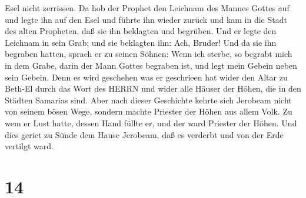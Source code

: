 Esel nicht zerrissen.  Da hob der Prophet den Leichnam des
Mannes Gottes auf und legte ihn auf den Esel und führte ihn wieder
zurück und kam in die Stadt des alten Propheten, daß sie ihn beklagten
und begrüben.  Und er legte den Leichnam in sein Grab; und
sie beklagten ihn: Ach, Bruder!  Und da sie ihn begraben
hatten, sprach er zu seinen Söhnen: Wenn ich sterbe, so begrabt mich in
dem Grabe, darin der Mann Gottes begraben ist, und legt mein Gebein
neben sein Gebein.  Denn es wird geschehen was er
geschrieen hat wider den Altar zu Beth-El durch das Wort des HERRN und
wider alle Häuser der Höhen, die in den Städten Samarias sind.
 Aber nach dieser Geschichte kehrte sich Jerobeam nicht von
seinem bösen Wege, sondern machte Priester der Höhen aus allem Volk. Zu
wem er Lust hatte, dessen Hand füllte er, und der ward Priester der
Höhen.  Und dies geriet zu Sünde dem Hause Jerobeam, daß es
verderbt und von der Erde vertilgt ward.

\hypertarget{section-13}{%
\section{14}\label{section-13}}

